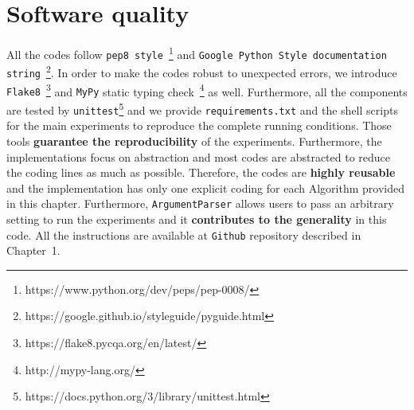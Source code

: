 \section{Software quality}
All the codes follow {\tt pep8 style}~\footnote{https://www.python.org/dev/peps/pep-0008/}
and {\tt Google Python Style documentation string}~\footnote{https://google.github.io/styleguide/pyguide.html}.
In order to make the codes robust to unexpected errors,
we introduce
{\tt Flake8}~\footnote{https://flake8.pycqa.org/en/latest/}
and {\tt MyPy} static typing check~\footnote{http://mypy-lang.org/} as well.
Furthermore, all the components are tested by
{\tt unittest}\footnote{https://docs.python.org/3/library/unittest.html}
and we provide {\tt requirements.txt}
and the shell scripts for the main experiments
to reproduce the complete running conditions.
Those tools {\bf guarantee the reproducibility} of the experiments.
Furthermore, the implementations focus on abstraction and
most codes are abstracted to reduce the coding lines as much as possible.
Therefore, the codes are {\bf highly reusable} and
the implementation has only one explicit coding for
each Algorithm provided in this chapter.
Furthermore, {\tt ArgumentParser} allows users to
pass an arbitrary setting to run the experiments
and it {\bf contributes to the generality} in this code.
All the instructions are available at {\tt Github} repository
described in Chapter~1.
